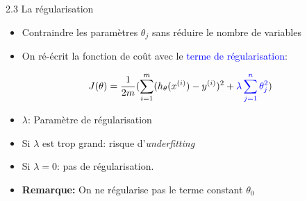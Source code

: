\begin{frame}{2.3 La régularisation}
  \begin{itemize}
  \item Contraindre les paramètres $\theta_{j}$ sans réduire le nombre de variables
  \item On ré-écrit la fonction de coût avec le \textcolor{blue}{terme de régularisation}:
  \end{itemize}
  \begin{equation*}
    J(\theta) = \frac{1}{2m}(\displaystyle\sum_{i=1}^{m}(h_{\theta}(x^{(i)}) - y^{(i)})^{2} + \textcolor{blue}{\lambda \displaystyle\sum_{j=1}^{n}\theta_{j}^{2}})
  \end{equation*}
  \begin{itemize}
  \item \boldmath $\lambda$: Paramètre de régularisation
  \item Si $\lambda$ est trop grand: risque d'\textit{underfitting}
  \item Si $\lambda = 0$: pas de régularisation. 
  \item \textbf{Remarque:} On ne régularise pas le terme constant $\theta_{0}$
  \end{itemize}
\end{frame}


